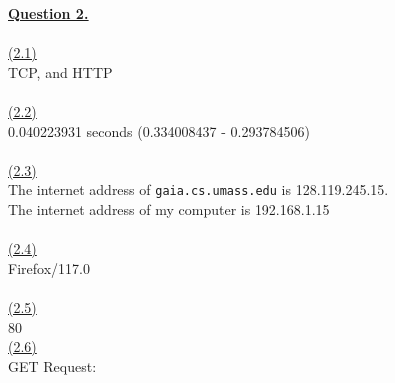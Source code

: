 \documentclass[12pt]{article}
\begin{document}
\newpage
\hyperlink{toc}{\LARGE \underline{\textbf{Question 2.}}}\\
~\\\hyperlink{toc}{\hypertarget{2.1}{(2.1)}}\\
TCP, and HTTP\\
~\\\hyperlink{toc}{\hypertarget{2.2}{(2.2)}}\\
0.040223931 seconds (0.334008437 - 0.293784506)\\
~\\\hyperlink{toc}{\hypertarget{2.3}{(2.3)}}\\
The internet address of \texttt{gaia.cs.umass.edu} is 128.119.245.15.\\
The internet address of my computer is 192.168.1.15\\
~\\\hyperlink{toc}{\hypertarget{2.4}{(2.4)}}\\
Firefox/117.0\\
~\\\hyperlink{toc}{\hypertarget{2.5}{(2.5)}}\\
80\newpage
~\\\hyperlink{toc}{\hypertarget{2.6}{(2.6)}}\\
GET Request:
\end{document}

